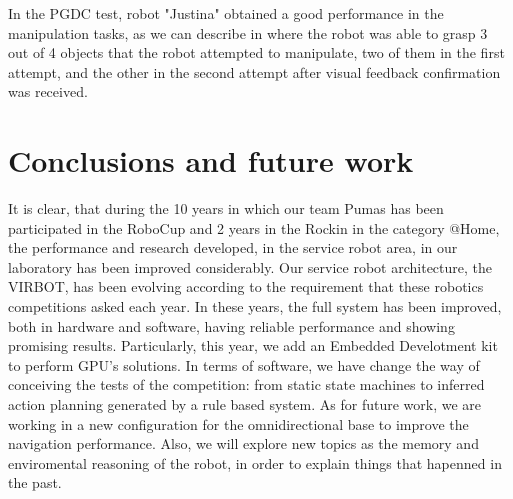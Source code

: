 \documentclass{llncs}
\begin{document}
In the PGDC test, robot "Justina" obtained a good performance in the manipulation tasks, as we can describe in \cite{iros2018} where the robot was able to grasp 3 out of 4 objects that the robot attempted to manipulate, two of them in the first attempt, and the other in the second attempt after visual feedback confirmation was received.


 





\section{Conclusions and future work}\label{sec:conclusions}
It is clear, that during the 10 years in which our team Pumas has been participated in the RoboCup and 2 years in the Rockin \cite{Robocup_2017} in the category @Home, the performance and research developed, in the service robot area, in our laboratory has been improved considerably.
Our service robot architecture, the VIRBOT, has been evolving according to the requirement that these robotics competitions asked each year.
In these years, the full system has been improved, both in hardware and software, having reliable performance and showing promising results. Particularly, this year, we add an Embedded Develotment kit \cite{jetson} to perform GPU's solutions.
In terms of software, we have change the way of conceiving the tests of the competition: from static state machines to inferred action planning generated by a rule based system. 
As for future work, we are working in a new configuration for the omnidirectional base to improve the navigation performance. Also, we will explore new topics as the memory and enviromental reasoning of the robot, in order to explain things that hapenned in the past.


\end{document}
